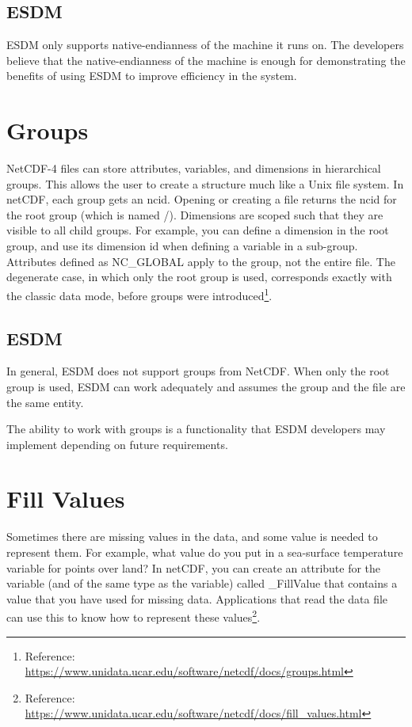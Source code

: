 \subsection{ESDM}

\tab
ESDM only supports native-endianness of the machine it runs on. The developers believe that the native-endianness of the machine is enough for demonstrating the benefits of using ESDM to improve efficiency in the system.

\section{Groups}

\tab
NetCDF-4 files can store attributes, variables, and dimensions in hierarchical groups. This allows the user to create a structure much like a Unix file system. In netCDF, each group gets an ncid. Opening or creating a file returns the ncid for the root group (which is named /). Dimensions are scoped such that they are visible to all child groups. For example, you can define a dimension in the root group, and use its dimension id when defining a variable in a sub-group. Attributes defined as NC\_GLOBAL apply to the group, not the entire file. The degenerate case, in which only the root group is used, corresponds exactly with the classic data mode, before groups were introduced\footnote{Reference: \url{https://www.unidata.ucar.edu/software/netcdf/docs/groups.html}}.

\subsection{ESDM}

\tab
In general, ESDM does not support groups from NetCDF. When only the root group is used, ESDM can work adequately and assumes the group and the file are the same entity.

The ability to work with groups is a functionality that ESDM developers may implement depending on future requirements.

\section{Fill Values}

\tab
Sometimes there are missing values in the data, and some value is needed to represent them. For example, what value do you put in a sea-surface temperature variable for points over land? In netCDF, you can create an attribute for the variable (and of the same type as the variable) called \_FillValue that contains a value that you have used for missing data. Applications that read the data file can use this to know how to represent these values\footnote{Reference: \url{https://www.unidata.ucar.edu/software/netcdf/docs/fill_values.html}}.

